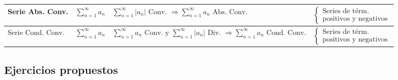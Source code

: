 \begin{table}[H]
{\begin{tabular}{|l|c|l|l|}
Serie Abs. Conv. & $\displaystyle\sum_{n=1}^{\infty}a_n$ & $\displaystyle\sum_{n=1}^{\infty}|a_n| \text{ Conv. } \Longrightarrow \displaystyle\sum_{n=1}^{\infty}a_n \text{ Abs. Conv.}$ & $\begin{cases} \text{Series de térm.} \\ \text{positivos y negativos} \end{cases}$ \\ \hline
Serie Cond. Conv. & $\displaystyle\sum_{n=1}^{\infty}a_n$ & $\displaystyle\sum_{n=1}^{\infty}a_n \text{ Conv. y } \displaystyle\sum_{n=1}^{\infty}|a_n| \text{ Div. } \Longrightarrow \displaystyle\sum_{n=1}^{\infty}a_n \text{ Cond. Conv.}$ & $\begin{cases} \text{Series de térm.} \\ \text{positivos y negativos} \end{cases}$ \\ \hline
\end{tabular}%
}
\end{table}

\newpage
\subsection{Ejercicios propuestos}

